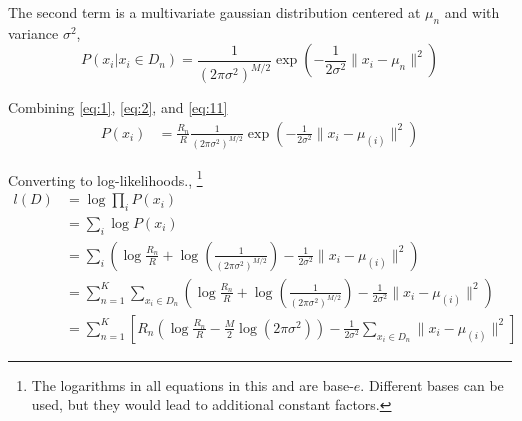 \documentclass[letterpaper]{article}
\begin{document}




The second term is a multivariate gaussian distribution centered at
$\mu_n$ and with variance $\sigma^2$,
%
\begin{equation}
  \label{eq:11}
  P(x_i|x_i \in D_n) = \frac{1}{(2 \pi \sigma^2)^{M/2}} \exp\left( -\frac{1}{2 \sigma^2} \| x_i - \mu_n \|^2\right)
\end{equation}

Combining \eqref{eq:1}, \eqref{eq:2}, and \eqref{eq:11}
%
\begin{align}
  \label{eq:12}
  P(x_i) & = \frac{R_n}{R} \frac{1}{(2 \pi \sigma^2)^{M/2}} \exp\left( -\frac{1}{2 \sigma^2} \| x_i - \mu_{(i)} \|^2\right) 
\end{align}

Converting to log-likelihoods., \footnote{The logarithms in all equations in this and \cite{Pelleg2000} are base-$e$.  Different bases can be used, but they
would lead to additional constant factors.}
%
\begin{align}
  l(D) & = \log \prod_i P(x_i) \nonumber \\
  & = \sum_i \log P(x_i) \nonumber \\
  \label{eq:13}
  & = \sum_i \left( \log \frac{R_n}{R}
                        + \log \left( \frac{1}{(2 \pi \sigma^2)^{M/2}} \right)
                        - \frac{1}{2\sigma^2} \|x_i - \mu_{(i)}\|^2 \right) \\
  & = \sum_{n=1}^K \sum_{x_i \in D_n} \left( \log \frac{R_n}{R}
                        + \log \left( \frac{1}{(2 \pi \sigma^2)^{M/2}} \right)
                        - \frac{1}{2\sigma^2} \|x_i - \mu_{(i)}\|^2 \right) \\
  & = \sum_{n=1}^K \left[ R_n \left( \log \frac{R_n}{R}
                                     - \frac{M}{2} \log \left(2 \pi \sigma^2 \right) \right)
                          - \frac{1}{2\sigma^2} \sum_{x_i \in D_n} \|x_i - \mu_{(i)}\|^2 \right]
\end{align}
\end{document}
